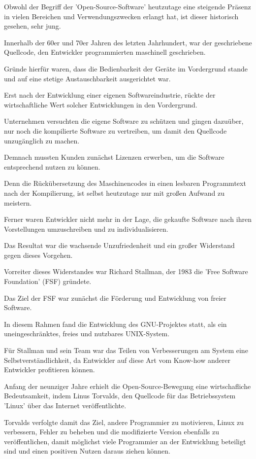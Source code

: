 Obwohl der Begriff der 'Open-Source-Software' heutzutage eine steigende Präsenz in vielen Bereichen und Verwendungszwecken erlangt hat, ist dieser historisch gesehen, sehr jung. 

Innerhalb der 60er und 70er Jahren des letzten Jahrhundert, war der geschriebene Quellcode, den Entwickler programmierten maschinell geschrieben. 

Gründe hierfür waren, dass die Bedienbarkeit der Geräte im Vordergrund stande und auf eine stetige Austauschbarkeit ausgerichtet war. 

Erst nach der Entwicklung einer eigenen Softwareindustrie, rückte der wirtschaftliche Wert solcher Entwicklungen in den Vordergrund. 

Unternehmen versuchten die eigene Software zu schützen und gingen dazuüber, nur noch die kompilierte Software zu vertreiben, um damit den Quellcode unzugänglich zu machen. 

Demnach mussten Kunden zunächst Lizenzen erwerben, um die Software entsprechend nutzen zu können.

Denn die Rückübersetzung des Maschinencodes in einen lesbaren Programmtext nach der Kompilierung, ist selbst heutzutage nur mit großen Aufwand zu meistern. 

Ferner waren Entwickler nicht mehr in der Lage, die gekaufte Software nach ihren Vorstellungen umzuschreiben und zu individualisieren. 

Das Resultat war die wachsende Unzufriedenheit und ein großer Widerstand gegen dieses Vorgehen. 

Vorreiter dieses Widerstandes war Richard Stallman, der 1983 die 'Free Software Foundation' (FSF) gründete. 

Das Ziel der FSF war zunächst die Förderung und Entwicklung von freier Software. 

In diesem Rahmen fand die Entwicklung des GNU-Projektes statt, als ein uneingeschränktes, freies und nutzbares UNIX-System. 

Für Stallman und sein Team war das Teilen von Verbesserungen am System eine Selbstverständlichkeit, da Entwickler auf diese Art vom Know-how anderer Entwickler profitieren können. 

Anfang der neunziger Jahre erhielt die Open-Source-Bewegung eine wirtschafliche Bedeutsamkeit, indem Linus Torvalds, den Quellcode für das Betriebssystem 'Linux' über das Internet veröffentlichte. 

Torvalds verfolgte damit das Ziel, andere Programmier zu motivieren, Linux zu verbessern, Fehler zu beheben und die modifizierte Version ebenfalls zu veröffentlichen, damit möglichst viele Programmier an der Entwicklung beteiligt sind und einen positiven Nutzen daraus ziehen können. 


